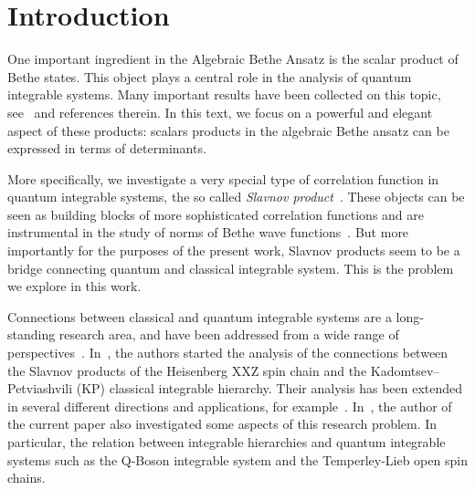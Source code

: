 \documentclass[a4paper,11pt]{amsart}
\begin{document}
\maketitle

\setcounter{tocdepth}{1}
\tableofcontents

\section{Introduction}

One important ingredient in the Algebraic Bethe Ansatz is the scalar
product of Bethe states. This object plays a central role in the
analysis of quantum integrable systems. Many important results have
been collected on this topic, see~\cite{Korepin:1993kvr} and
references therein. In this text, we focus on a powerful and elegant
aspect of these products: scalars products in the algebraic Bethe
ansatz can be expressed in terms of determinants.

More specifically, we investigate a very special type of correlation
function in quantum integrable systems, the so called \emph{Slavnov
product}~\cite{Slavnov1989}. These objects can be seen as building
blocks of more sophisticated correlation functions and are
instrumental in the study of norms of Bethe wave
functions~\cite{Korepin:1993kvr}. But more importantly for the
purposes of the present work, Slavnov products seem to be a bridge
connecting quantum and classical integrable system. This is the
problem we explore in this work.

Connections between classical and quantum integrable systems are a
long-standing research area, and have been addressed from a wide range
of perspectives~\cite{Wu:1975mw, Its:1992bj, korepin2000the, Foda2009,
  Alexandrov:2011aa, Zabrodin:2012vj, Alexandrov:2013hca}.
In~\cite{Foda:2009zz}, the authors started the analysis of the
connections between the Slavnov products of the Heisenberg XXZ spin
chain and the Kadomtsev–Petviashvili (KP) classical integrable
hierarchy. Their analysis has been extended in several different
directions and applications, for example~\cite{Wheeler:2010vmq,
  Foda:2010, Takasaki:2010qm, Foda:2012wn, Foda:2012wf}.
In~\cite{Araujo:2021ghu, Araujo:2024klz}, the author of the current
paper also investigated some aspects of this research problem. In
particular, the relation between integrable hierarchies and quantum
integrable systems such as the Q-Boson integrable system and the
Temperley-Lieb open spin chains.
\end{document}
